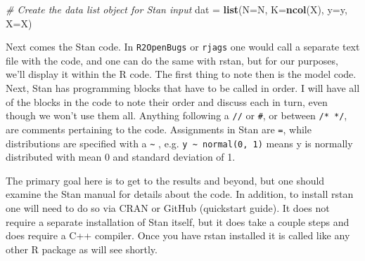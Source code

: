 \documentclass[]{book}
\newenvironment{Shaded}{\begin{snugshade}}{\end{snugshade}}
\newcommand{\CommentTok}[1]{\textcolor[rgb]{0.56,0.35,0.01}{\textit{#1}}}
\newcommand{\DataTypeTok}[1]{\textcolor[rgb]{0.13,0.29,0.53}{#1}}
\newcommand{\KeywordTok}[1]{\textcolor[rgb]{0.13,0.29,0.53}{\textbf{#1}}}
\newcommand{\NormalTok}[1]{#1}
\newcommand{\StringTok}[1]{\textcolor[rgb]{0.31,0.60,0.02}{#1}}
\begin{document}
\begin{Shaded}
\begin{Highlighting}[]
\CommentTok{# Create the data list object for Stan input}
\NormalTok{dat =}\StringTok{ }\KeywordTok{list}\NormalTok{(}\DataTypeTok{N=}\NormalTok{N, }\DataTypeTok{K=}\KeywordTok{ncol}\NormalTok{(X), }\DataTypeTok{y=}\NormalTok{y, }\DataTypeTok{X=}\NormalTok{X)}
\end{Highlighting}
\end{Shaded}

Next comes the Stan code. In \texttt{R2OpenBugs} or \texttt{rjags} one would call a separate text file with the code, and one can do the same with rstan, but for our purposes, we'll display it within the R code. The first thing to note then is the model code. Next, Stan has programming blocks that have to be called in order. I will have all of the blocks in the code to note their order and discuss each in turn, even though we won't use them all. Anything following a \texttt{//} or \texttt{\#}, or between \texttt{/*\ */}, are comments pertaining to the code. Assignments in Stan are \texttt{=}, while distributions are specified with a \texttt{\textasciitilde{}} , e.g. \texttt{y\ \textasciitilde{}\ normal(0,\ 1)} means y is normally distributed with mean 0 and standard deviation of 1.

The primary goal here is to get to the results and beyond, but one should examine the Stan manual for details about the code. In addition, to install rstan one will need to do so via CRAN or GitHub (quickstart guide). It does not require a separate installation of Stan itself, but it does take a couple steps and does require a C++ compiler. Once you have rstan installed it is called like any other R package as will see shortly.
\end{document}
